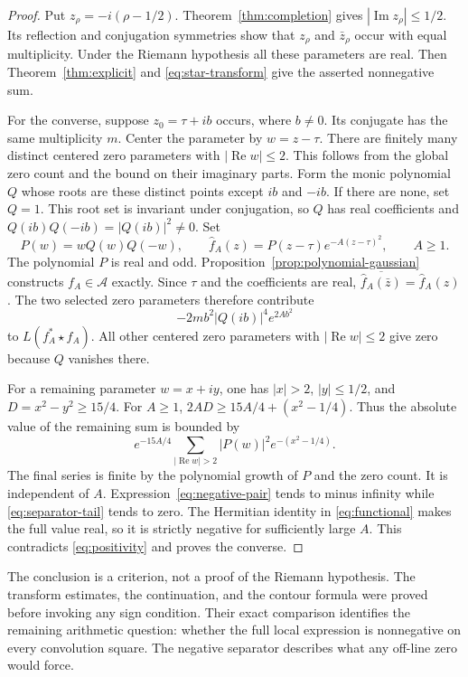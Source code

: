 \documentclass[11pt]{article}
\numberwithin{equation}{section}
\newcommand{\A}{\mathcal A}
\begin{document}
\begin{proof}
Put $z_\rho=-i(\rho-1/2)$.
Theorem~\ref{thm:completion} gives $|\operatorname{Im}z_\rho|\leq1/2$.
Its reflection and conjugation symmetries show that $z_\rho$ and
$\bar z_\rho$ occur with equal multiplicity.
Under the Riemann hypothesis all these parameters are real.
Then Theorem~\ref{thm:explicit} and \eqref{eq:star-transform} give the
asserted nonnegative sum.

For the converse, suppose $z_0=\tau+ib$ occurs, where $b\ne0$.
Its conjugate has the same multiplicity $m$.
Center the parameter by $w=z-\tau$.
There are finitely many distinct centered zero parameters with
$|\operatorname{Re}w|\leq2$.
This follows from the global zero count and the bound on their imaginary
parts.  Form the monic polynomial $Q$ whose roots are these distinct points
except $ib$ and $-ib$.  If there are none, set $Q=1$.
This root set is invariant under conjugation, so $Q$ has real coefficients
and $Q(ib)Q(-ib)=|Q(ib)|^2\ne0$.
Set
\[
 P(w)=wQ(w)Q(-w),\qquad
 \widehat f_A(z)=P(z-\tau)e^{-A(z-\tau)^2},\qquad A\geq1.
\]
The polynomial $P$ is real and odd.
Proposition~\ref{prop:polynomial-gaussian} constructs $f_A\in\A$ exactly.
Since $\tau$ and the coefficients are real,
$\overline{\widehat f_A(\bar z)}=\widehat f_A(z)$.
The two selected zero parameters therefore contribute
\begin{equation}
 -2m b^2|Q(ib)|^4e^{2Ab^2}
 \label{eq:negative-pair}
\end{equation}
to $L(f_A^*\star f_A)$.
All other centered zero parameters with $|\operatorname{Re}w|\leq2$
give zero because $Q$ vanishes there.

For a remaining parameter $w=x+iy$, one has $|x|>2$, $|y|\leq1/2$,
and $D=x^2-y^2\geq15/4$.
For $A\geq1$, $2AD\geq15A/4+(x^2-1/4)$.
Thus the absolute value of the remaining sum is bounded by
\begin{equation}
 e^{-15A/4}
 \sum_{|\operatorname{Re}w|>2}|P(w)|^2e^{-(x^2-1/4)}.
 \label{eq:separator-tail}
\end{equation}
The final series is finite by the polynomial growth of $P$ and the zero
count.  It is independent of $A$.
Expression~\eqref{eq:negative-pair} tends to minus infinity while
\eqref{eq:separator-tail} tends to zero.
The Hermitian identity in \eqref{eq:functional} makes the full value real,
so it is strictly negative for sufficiently large $A$.
This contradicts \eqref{eq:positivity} and proves the converse.
\end{proof}

The conclusion is a criterion, not a proof of the Riemann hypothesis.
The transform estimates, the continuation, and the contour formula were
proved before invoking any sign condition.
Their exact comparison identifies the remaining arithmetic question:
whether the full local expression is nonnegative on every convolution square.
The negative separator describes what any off-line zero would force.
\end{document}
